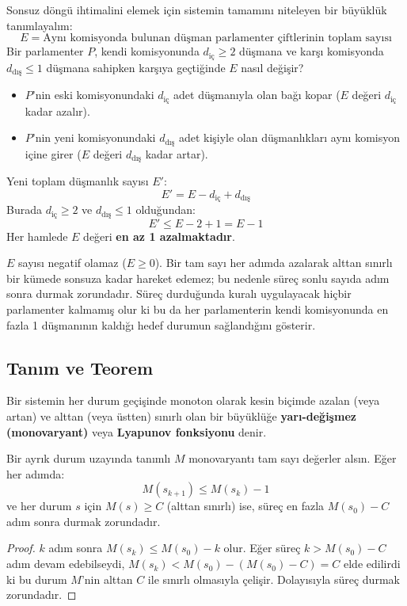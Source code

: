 Sonsuz döngü ihtimalini elemek için sistemin tamamını niteleyen bir büyüklük tanımlayalım:
\[
E = \text{Aynı komisyonda bulunan düşman parlamenter çiftlerinin toplam sayısı}
\]
Bir parlamenter $P$, kendi komisyonunda $d_{\text{iç}} \ge 2$ düşmana ve karşı komisyonda $d_{\text{dış}} \le 1$ düşmana sahipken karşıya geçtiğinde $E$ nasıl değişir?
\begin{itemize}
    \item $P$'nin eski komisyonundaki $d_{\text{iç}}$ adet düşmanıyla olan bağı kopar ($E$ değeri $d_{\text{iç}}$ kadar azalır).
    \item $P$'nin yeni komisyonundaki $d_{\text{dış}}$ adet kişiyle olan düşmanlıkları aynı komisyon içine girer ($E$ değeri $d_{\text{dış}}$ kadar artar).
\end{itemize}
Yeni toplam düşmanlık sayısı $E'$:
\[
E' = E - d_{\text{iç}} + d_{\text{dış}}
\]
Burada $d_{\text{iç}} \ge 2$ ve $d_{\text{dış}} \le 1$ olduğundan:
\[
E' \le E - 2 + 1 = E - 1
\]
Her hamlede $E$ değeri \textbf{en az 1 azalmaktadır}.

$E$ sayısı negatif olamaz ($E \ge 0$). Bir tam sayı her adımda azalarak alttan sınırlı bir kümede sonsuza kadar hareket edemez; bu nedenle süreç sonlu sayıda adım sonra durmak zorundadır. Süreç durduğunda kuralı uygulayacak hiçbir parlamenter kalmamış olur ki bu da her parlamenterin kendi komisyonunda en fazla 1 düşmanının kaldığı hedef durumun sağlandığını gösterir.

\subsection{Tanım ve Teorem}

\begin{definition}
Bir sistemin her durum geçişinde monoton olarak kesin biçimde azalan (veya artan) ve alttan (veya üstten) sınırlı olan bir büyüklüğe \textbf{yarı-değişmez (monovaryant)} veya \textbf{Lyapunov fonksiyonu} denir.
\end{definition}

\begin{theorem}
Bir ayrık durum uzayında tanımlı $M$ monovaryantı tam sayı değerler alsın. Eğer her adımda:
\[
M(s_{k+1}) \le M(s_k) - 1
\]
ve her durum $s$ için $M(s) \ge C$ (alttan sınırlı) ise, süreç en fazla $M(s_0) - C$ adım sonra durmak zorundadır.
\end{theorem}

\begin{proof}
$k$ adım sonra $M(s_k) \le M(s_0) - k$ olur. Eğer süreç $k > M(s_0) - C$ adım devam edebilseydi,
$M(s_k) < M(s_0) - (M(s_0) - C) = C$
elde edilirdi ki bu durum $M$'nin alttan $C$ ile sınırlı olmasıyla çelişir. Dolayısıyla süreç durmak zorundadır.
\end{proof}

